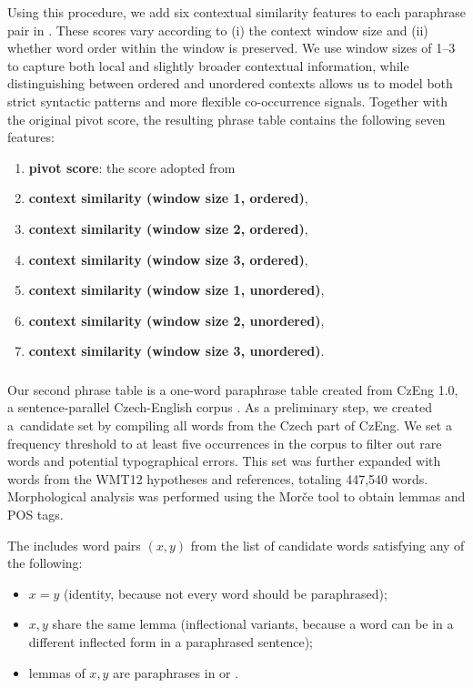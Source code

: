 Using this procedure, we add six contextual similarity features to each paraphrase pair in \cmpt. These scores vary according to (i) the context window size and (ii) whether word order within the window is preserved. We use window sizes of 1–3 to capture both local and slightly broader contextual information, while distinguishing between ordered and unordered contexts allows us to model both strict syntactic patterns and more flexible co-occurrence signals. Together with the original pivot score, the resulting \enhanedmeteor phrase table contains the following seven features: 

\begin{enumerate}
\item \textbf{pivot score}: the score adopted from \cmpt
\item \textbf{context similarity (window size 1, ordered)},
\item \textbf{context similarity (window size 2, ordered)},
\item \textbf{context similarity (window size 3, ordered)},
\item \textbf{context similarity (window size 1, unordered)},
\item \textbf{context similarity (window size 2, unordered)},
\item \textbf{context similarity (window size 3, unordered)}.
\end{enumerate}


\subsubsection{\owpt}

Our second phrase table is a one-word paraphrase table created from CzEng 1.0, a sentence-parallel Czech-English  corpus \citep{czeng10:lrec2012}. As a preliminary step, we created a~candidate set by compiling all words from the Czech part of CzEng. We set a frequency threshold to at least five occurrences in the corpus to filter out rare words and potential typographical errors. This set was further expanded with words from the WMT12 hypotheses and references, totaling 447,540 words.  Morphological analysis was performed using the Morče tool \citep{morce:2007} to obtain lemmas and POS tags.

The \owpt  includes word pairs $(x, y)$ from the list of candidate words satisfying any of the following:

\begin{itemize}
\item $x = y$ (identity, because not every word should be paraphrased);
\item $x, y$ share the same lemma (inflectional variants, because a word can be in a different inflected form in a paraphrased sentence);
\item lemmas of $ x,y $ are paraphrases in \wordnet or \fm.
\end{itemize}

